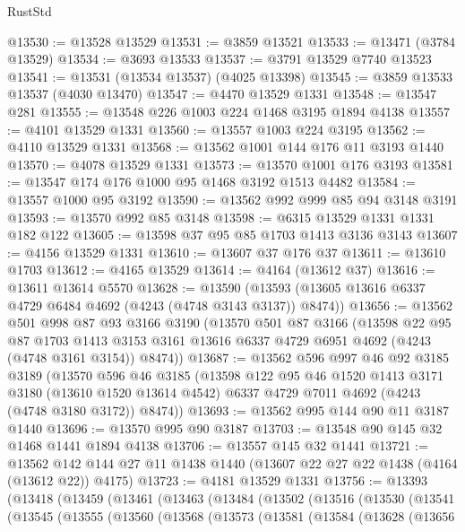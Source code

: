 \begin{lexlean}{RustStd}
\begin{coremodule}
@13530 := @13528 @13529
@13531 := @3859 @13521
@13533 := @13471 (@3784 @13529)
@13534 := @3693 @13533
@13537 := @3791 @13529 @7740 @13523
@13541 := @13531 (@13534 @13537) (@4025 @13398)
@13545 := @3859 @13533 @13537 (@4030 @13470)
@13547 := @4470 @13529 @1331
@13548 := @13547 @281
@13555 := @13548 @226 @1003 @224 @1468 @3195 @1894 @4138
@13557 := @4101 @13529 @1331
@13560 := @13557 @1003 @224 @3195
@13562 := @4110 @13529 @1331
@13568 := @13562 @1001 @144 @176 @11 @3193 @1440
@13570 := @4078 @13529 @1331
@13573 := @13570 @1001 @176 @3193
@13581 := @13547 @174 @176 @1000 @95 @1468 @3192 @1513 @4482
@13584 := @13557 @1000 @95 @3192
@13590 := @13562 @992 @999 @85 @94 @3148 @3191
@13593 := @13570 @992 @85 @3148
@13598 := @6315 @13529 @1331 @1331 @182 @122
@13605 := @13598 @37 @95 @85 @1703 @1413 @3136 @3143
@13607 := @4156 @13529 @1331
@13610 := @13607 @37 @176 @37
@13611 := @13610 @1703
@13612 := @4165 @13529
@13614 := @4164 (@13612 @37)
@13616 := @13611 @13614 @5570
@13628 := @13590 (@13593 (@13605 @13616 @6337 @4729 @6484 @4692 (@4243 (@4748 @3143 @3137)) @8474))
@13656 := @13562
    @501
    @998
    @87
    @93
    @3166
    @3190
    (@13570
      @501
      @87
      @3166
      (@13598
        @22
        @95
        @87
        @1703
        @1413
        @3153
        @3161
        @13616
        @6337
        @4729
        @6951
        @4692
        (@4243 (@4748 @3161 @3154))
        @8474))
@13687 := @13562
    @596
    @997
    @46
    @92
    @3185
    @3189
    (@13570
      @596
      @46
      @3185
      (@13598
        @122
        @95
        @46
        @1520
        @1413
        @3171
        @3180
        (@13610 @1520 @13614 @4542)
        @6337
        @4729
        @7011
        @4692
        (@4243 (@4748 @3180 @3172))
        @8474))
@13693 := @13562 @995 @144 @90 @11 @3187 @1440
@13696 := @13570 @995 @90 @3187
@13703 := @13548 @90 @145 @32 @1468 @1441 @1894 @4138
@13706 := @13557 @145 @32 @1441
@13721 := @13562 @142 @144 @27 @11 @1438 @1440 (@13607 @22 @27 @22 @1438 (@4164 (@13612 @22)) @4175)
@13723 := @4181 @13529 @1331
@13756 := @13393
    (@13418
      (@13459
        (@13461
          (@13463
            (@13484
              (@13502
                (@13516
                  (@13530
                    (@13541
                      (@13545
                        (@13555
                          (@13560
                            (@13568
                              (@13573
                                (@13581
                                  (@13584
                                    (@13628
                                      (@13656

\end{coremodule}
\end{lexlean}

